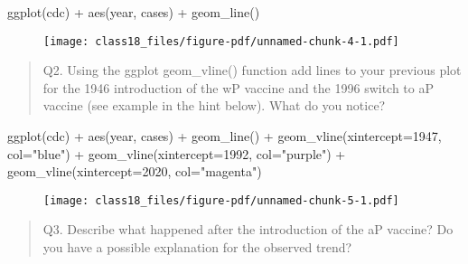 \documentclass[
  letterpaper,
  DIV=11,
  numbers=noendperiod]{scrartcl}
\newenvironment{Shaded}{\begin{snugshade}}{\end{snugshade}}
\newcommand{\AttributeTok}[1]{\textcolor[rgb]{0.40,0.45,0.13}{#1}}
\newcommand{\DecValTok}[1]{\textcolor[rgb]{0.68,0.00,0.00}{#1}}
\newcommand{\FunctionTok}[1]{\textcolor[rgb]{0.28,0.35,0.67}{#1}}
\newcommand{\NormalTok}[1]{\textcolor[rgb]{0.00,0.23,0.31}{#1}}
\newcommand{\SpecialCharTok}[1]{\textcolor[rgb]{0.37,0.37,0.37}{#1}}
\newcommand{\StringTok}[1]{\textcolor[rgb]{0.13,0.47,0.30}{#1}}
\begin{document}
\begin{Shaded}
\begin{Highlighting}[]
\FunctionTok{ggplot}\NormalTok{(cdc) }\SpecialCharTok{+}
  \FunctionTok{aes}\NormalTok{(year, cases) }\SpecialCharTok{+}
  \FunctionTok{geom\_line}\NormalTok{()}
\end{Highlighting}
\end{Shaded}

\begin{figure}[H]

{\centering \texttt{[image: class18\_files/figure-pdf/unnamed-chunk-4-1.pdf]}

}

\end{figure}

\begin{quote}
Q2. Using the ggplot geom\_vline() function add lines to your previous
plot for the 1946 introduction of the wP vaccine and the 1996 switch to
aP vaccine (see example in the hint below). What do you notice?
\end{quote}

\begin{Shaded}
\begin{Highlighting}[]
\FunctionTok{ggplot}\NormalTok{(cdc) }\SpecialCharTok{+}
  \FunctionTok{aes}\NormalTok{(year, cases) }\SpecialCharTok{+}
  \FunctionTok{geom\_line}\NormalTok{() }\SpecialCharTok{+}
  \FunctionTok{geom\_vline}\NormalTok{(}\AttributeTok{xintercept=}\DecValTok{1947}\NormalTok{, }\AttributeTok{col=}\StringTok{"blue"}\NormalTok{) }\SpecialCharTok{+}
  \FunctionTok{geom\_vline}\NormalTok{(}\AttributeTok{xintercept=}\DecValTok{1992}\NormalTok{, }\AttributeTok{col=}\StringTok{"purple"}\NormalTok{) }\SpecialCharTok{+}
  \FunctionTok{geom\_vline}\NormalTok{(}\AttributeTok{xintercept=}\DecValTok{2020}\NormalTok{, }\AttributeTok{col=}\StringTok{"magenta"}\NormalTok{)}
\end{Highlighting}
\end{Shaded}

\begin{figure}[H]

{\centering \texttt{[image: class18\_files/figure-pdf/unnamed-chunk-5-1.pdf]}

}

\end{figure}

\begin{quote}
Q3. Describe what happened after the introduction of the aP vaccine? Do
you have a possible explanation for the observed trend?
\end{quote}
\end{document}
